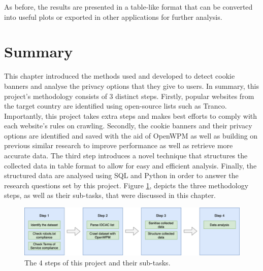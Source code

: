 \documentclass[../main.tex]{subfiles}
\begin{document}
As before, the results are presented in a table-like format that can be converted into useful plots or exported in other applications for further analysis.

\section{Summary}
This chapter introduced the methods used and developed to detect cookie banners and analyse the privacy options that they give to users. In summary, this project’s methodology consists of 3 distinct steps. Firstly, popular websites from the target country are identified using open-source lists such as Tranco. Importantly, this project takes extra steps and makes best efforts to comply with each website's rules on crawling. Secondly, the cookie banners and their privacy options are identified and saved with the aid of OpenWPM as well as building on previous similar research to improve performance as well as retrieve more accurate data. The third step introduces a novel technique that structures the collected data in table format to allow for easy and efficient analysis. Finally, the structured data are analysed using SQL and Python in order to answer the research questions set by this project. Figure \ref{fig:methods_steps}, depicts the three methodology steps, as well as their sub-tasks, that were discussed in this chapter.

\begin{figure}[ht]
    \centering
    \includegraphics[width=\textwidth]{images/methodology/steps.png}
    \caption{The 4 steps of this project and their sub-tasks.}
    \label{fig:methods_steps}
\end{figure}
\end{document}
